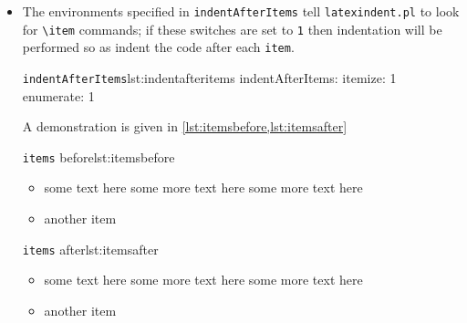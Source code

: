 \documentclass[11pt]{article}
\newcommand{\verbitem}[1]{\small\PVerb{#1}}
\begin{document}
\begin{itemize}
	You can add any of your own custom heading commands to this field, specifying the \lstinline!level!
	as appropriate.  You can also specify your own indentation in \lstinline!indentRules!--
	you will find the default \lstinline!indentRules! contains \lstinline!chapter: " "! which
	tells \lstinline!latexindent.pl! simply to use a space character after \lstinline!\chapter! headings
	(once \lstinline!indent! is set to \lstinline!1! for \lstinline!chapter!).

	\item[\verbitem{indentAfterItems}] The environments specified in \lstinline!indentAfterItems!  tell
	      \lstinline!latexindent.pl! to look for \lstinline!\item! commands; if these switches are set to \lstinline!1!
	      then indentation will be performed so as indent the code after each \lstinline!item!.
	      \begin{cmhlistings}{\lstinline!indentAfterItems!}{lst:indentafteritems}
indentAfterItems:
    itemize: 1
    enumerate: 1
	\end{cmhlistings}
	A demonstration is given in \cref{lst:itemsbefore,lst:itemsafter}

	\begin{minipage}{.5\textwidth}
		\begin{cmhlistings}[style=demo,xleftmargin=-3mm,columns=fixed]{\lstinline!items! before}{lst:itemsbefore}
\begin{itemize}
\item some text here
some more text here
some more text here
\item another item
\end{itemize}
		\end{cmhlistings}
	\end{minipage}%
	\begin{minipage}{.5\textwidth}
		\begin{cmhlistings}[style=demo,xleftmargin=-3mm,columns=fixed]{\lstinline!items! after}{lst:itemsafter}
\begin{itemize}
	\item some text here
		   some more text here
		   some more text here
	\item another item
\end{itemize}
		\end{cmhlistings}
	\end{minipage}


\end{itemize}
\end{document}
